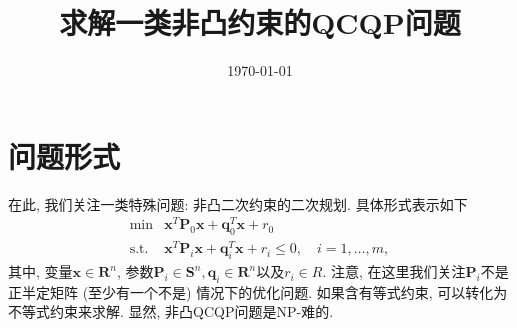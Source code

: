 \documentclass{article}
\begin{document}
\title{求解一类非凸约束的QCQP问题}
\date{\today} %
\maketitle %





\section{问题形式}
在此, 我们关注一类特殊问题: 非凸二次约束的二次规划.
具体形式表示如下
\begin{equation} \label{equ:nonconvex QCQP}
\begin{array}{cl}
{\min}  & {\bm{x}^T \bm{P}_0 \bm{x} + \bm{q}_0^T \bm{x} + r_0} \\
{\text{s.t.}} & {\bm{x}^T \bm{P}_i \bm{x} + \bm{q}_i^T \bm{x} + r_i \leq 0, \quad i = 1,\dots,m},
\end{array}
\end{equation}
其中, 变量$\bm{x} \in \bm{R}^n$, 参数$\bm{P}_i \in \bm{S}^n, \bm{q}_i \in \bm{R}^n$以及$r_i \in R$.
注意, 在这里我们关注$\bm{P}_i$不是正半定矩阵 (至少有一个不是) 情况下的优化问题.
如果含有等式约束, 可以转化为不等式约束来求解.
显然, 非凸QCQP问题是NP-难的.

\end{document}
